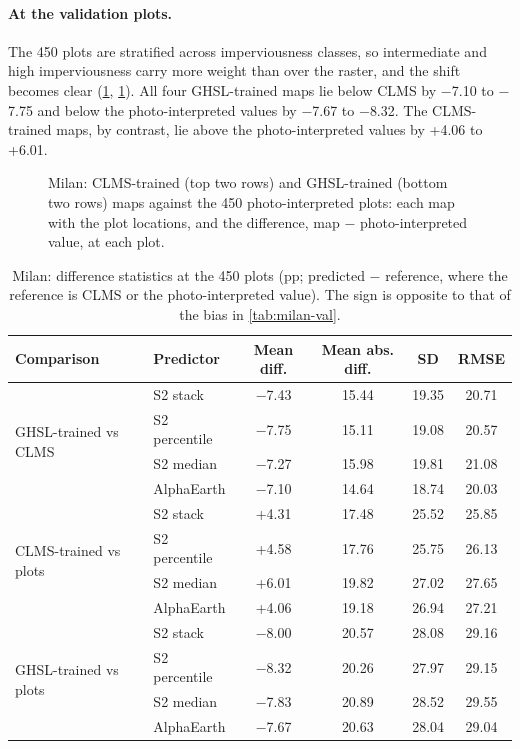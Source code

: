\paragraph{At the validation plots.} The 450 plots are stratified across
imperviousness classes, so intermediate and high imperviousness carry more
weight than over the raster, and the shift becomes clear
(\cref{tab:milan-plots}, \cref{fig:milan-plots}). All four GHSL-trained
maps lie below CLMS by $-$7.10 to $-$7.75\pp{} and below the photo-interpreted
values by $-$7.67 to $-$8.32\pp. The CLMS-trained maps, by contrast, lie
above the photo-interpreted values by +4.06 to +6.01\pp.

\begin{figure}[htbp]
  \centering
  \caption{Milan: CLMS-trained (top two rows) and GHSL-trained (bottom two
  rows) maps against the 450 photo-interpreted plots: each map with the plot
  locations, and the difference, map $-$ photo-interpreted value, at each
  plot.}
  \label{fig:milan-plots}
\end{figure}

\begin{table}[htbp]
  \centering
  \small
  \caption{Milan: difference statistics at the 450 plots (pp; predicted
  $-$ reference, where the reference is CLMS or the photo-interpreted value).
  The sign is opposite to that of the bias in \cref{tab:milan-val}.}
  \label{tab:milan-plots}
  \begin{tabular}{llcccc}
    \toprule
    Comparison & Predictor & Mean diff. & Mean abs. diff. & SD & RMSE \\
    \midrule
    \multirow{4}{*}{GHSL-trained vs CLMS}
      & S2 stack      & $-$7.43 & 15.44 & 19.35 & 20.71 \\
      & S2 percentile & $-$7.75 & 15.11 & 19.08 & 20.57 \\
      & S2 median     & $-$7.27 & 15.98 & 19.81 & 21.08 \\
      & AlphaEarth    & $-$7.10 & 14.64 & 18.74 & 20.03 \\
    \midrule
    \multirow{4}{*}{CLMS-trained vs plots}
      & S2 stack      & +4.31 & 17.48 & 25.52 & 25.85 \\
      & S2 percentile & +4.58 & 17.76 & 25.75 & 26.13 \\
      & S2 median     & +6.01 & 19.82 & 27.02 & 27.65 \\
      & AlphaEarth    & +4.06 & 19.18 & 26.94 & 27.21 \\
    \midrule
    \multirow{4}{*}{GHSL-trained vs plots}
      & S2 stack      & $-$8.00 & 20.57 & 28.08 & 29.16 \\
      & S2 percentile & $-$8.32 & 20.26 & 27.97 & 29.15 \\
      & S2 median     & $-$7.83 & 20.89 & 28.52 & 29.55 \\
      & AlphaEarth    & $-$7.67 & 20.63 & 28.04 & 29.04 \\
    \bottomrule
  \end{tabular}
\end{table}

